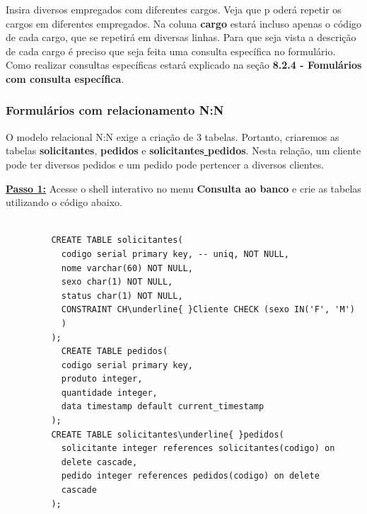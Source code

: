\documentclass[9pt]{report}
\begin{document}
{       Insira diversos empregados com diferentes cargos. Veja que p
       oderá repetir os cargos em diferentes empregados. Na coluna
       \textbf{cargo} estará incluso apenas o código de cada cargo,
       que se repetirá em diversas linhas. Para que seja vista a
       descrição de cada cargo é preciso que seja feita uma consulta
       específica no formulário. Como realizar consultas específicas
       estará explicado na seção
       \textbf{8.2.4 - Fomulários com consulta específica}.

       \subsubsection{Formulários com relacionamento N:N}


       O modelo relacional N:N exige a criação de 3 tabelas.
       Portanto, criaremos as tabelas \textbf{solicitantes},
       \textbf{pedidos} e \textbf{solicitantes\underline{ }pedidos}.
       Nesta relação, um cliente pode ter diversos pedidos e um
      pedido pode pertencer a diversos clientes. 

       \underline{\textbf{Passo 1:}} Acesse o shell interativo no
       menu \textbf{Consulta ao banco} e crie as tabelas utilizando
       o código abaixo.
       
       \begin{lstlisting}

         CREATE TABLE solicitantes(
           codigo serial primary key, -- uniq, NOT NULL,
           nome varchar(60) NOT NULL,
           sexo char(1) NOT NULL,
           status char(1) NOT NULL,  
           CONSTRAINT CH\underline{ }Cliente CHECK (sexo IN('F', 'M')
           )
         );
           CREATE TABLE pedidos(
           codigo serial primary key,
           produto integer,
           quantidade integer,
           data timestamp default current_timestamp
         );
         CREATE TABLE solicitantes\underline{ }pedidos(
           solicitante integer references solicitantes(codigo) on
           delete cascade,
           pedido integer references pedidos(codigo) on delete
           cascade
         );
       \end{lstlisting}
        
}
\end{document}
